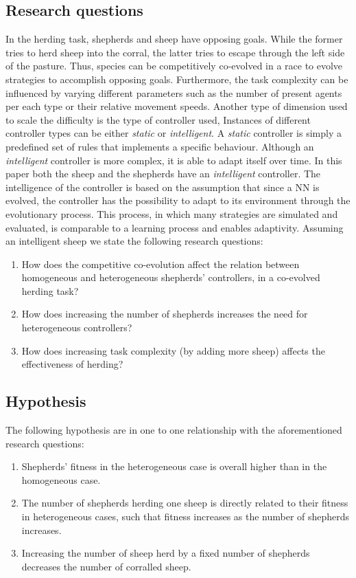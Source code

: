 \documentclass[conference]{IEEEtran}
\begin{document}
\subsection{Research questions}
\label{sec:researchQuestions}
In the herding task, shepherds and sheep have opposing goals.
While the former tries to herd sheep into the corral, the latter tries to escape through the left side of the pasture. 
Thus, species can be competitively co-evolved in a race to evolve strategies to accomplish opposing goals. 
Furthermore, the task complexity can be influenced by varying different parameters such as the number of present agents per each type or their relative movement speeds. 
Another type of dimension used to scale the difficulty is the type of controller used,
Instances of different controller types can be either \textit{static} or \textit{intelligent}.
A \textit{static} controller is simply a predefined set of rules that implements a specific behaviour.
Although an \textit{intelligent} controller is more complex, it is able to  adapt itself over time.
In this paper both the sheep and the shepherds have an \textit{intelligent} controller.
The intelligence of the controller is based on the assumption that since a NN is evolved, the controller has the possibility to adapt to its environment through the evolutionary process. 
This process, in which many strategies are simulated and evaluated, is comparable to a learning process and enables adaptivity. 
Assuming an intelligent sheep we state the following research questions:
 
\begin{enumerate}
	\item How does the competitive co-evolution affect the relation between homogeneous and heterogeneous shepherds' controllers, in a co-evolved herding task?
	\item How does increasing the number of shepherds increases the need for heterogeneous controllers?
	\item How does increasing task complexity (by adding more sheep) affects the effectiveness of herding?
\end{enumerate}

\subsection{Hypothesis}
\label{sec:hypothesis}
The following hypothesis are in one to one relationship with the aforementioned research questions:

\begin{enumerate}
	\item Shepherds' fitness in the heterogeneous case is overall higher than in the homogeneous case.
	\item The number of shepherds herding one sheep is directly related to their fitness in heterogeneous cases, such that fitness increases as the number of shepherds increases.	
	\item Increasing the number of sheep herd by a fixed number of shepherds decreases the number of corralled sheep.
\end{enumerate}
 
\end{document}
